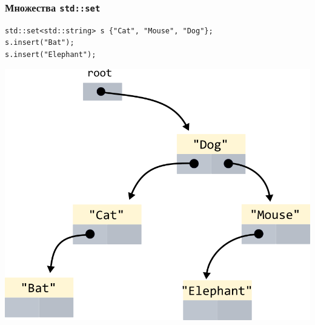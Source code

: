 \documentclass[10pt,pdf,hyperref={unicode}]{beamer}
\begin{document}
\begin{frame}[fragile]
\frametitle{Множества \texttt{std::set}}
\begin{lstlisting}
std::set<std::string> s {"Cat", "Mouse", "Dog"};
s.insert("Bat");
s.insert("Elephant");
\end{lstlisting}

\begin{center}
\includegraphics[scale=0.8]{images/tree/bst_set_string.png}
\end{center}
\end{frame}
\end{document}
